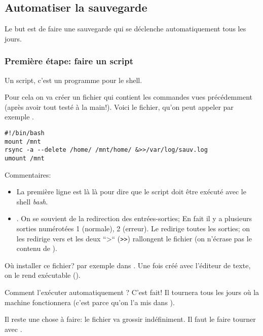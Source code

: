 \subsection{Automatiser la sauvegarde}
Le but est de faire une sauvegarde qui se déclenche automatiquement
tous les jours.

\subsubsection{Première étape: faire un \og script\fg}
Un script, c'est un programme pour le shell.\label{save1}

Pour cela on va créer un fichier qui contient les commandes vues précédemment
(après avoir tout testé à la main!). Voici le fichier, qu'on peut
  appeler par exemple .

  \begin{center}
  \begin{boxedminipage}{0.85\textwidth}
\begin{verbatim}
#!/bin/bash
mount /mnt
rsync -a --delete /home/ /mnt/home/ &>>/var/log/sauv.log
umount /mnt
\end{verbatim}
  \end{boxedminipage}
  \end{center}

Commentaires:
\begin{itemize}
  \item La première ligne est là là pour dire que le script doit être exécuté
    avec le shell \emph{bash}.
  \item  {}. On se souvient de la
    redirection des entrées-sorties; En fait il y a plusieurs sorties
    numérotées 1 (normale), 2 (erreur). Le \ttt{\&} redirige toutes
    les sorties; on les redirige vers  et les deux ``>``
    (\texttt{>>}) rallongent le fichier   (on
    n'écrase pas le contenu de  ).
\end{itemize}

Où installer ce fichier? par exemple dans . Une
fois créé avec l'éditeur de texte, on le rend exécutable ().


Comment l'exécuter automatiquement ? C'est fait! Il tournera tous les
jours où la machine fonctionnera (c'est parce qu'on l'a mis dans
).


Il reste une chose à faire: le fichier   va
grossir indéfiniment. Il faut le faire \og tourner\fg{} avec
.

